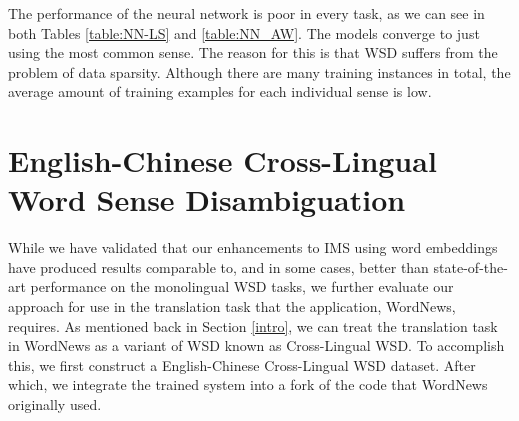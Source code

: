 \documentclass[11pt]{article}
\begin{document}
The performance of the neural network is poor in every task, as we can see in both Tables \ref{table:NN-LS} and \ref{table:NN_AW}. The models converge to just using the most common sense. The reason for this is that WSD suffers from the problem of data sparsity. Although there are many training instances in total, the average amount of training examples for each individual sense is low. 


\section{English-Chinese Cross-Lingual Word Sense Disambiguation}
\label{section:CLWSD}



While we have validated that our enhancements to IMS using word embeddings have produced results comparable to, and in some cases, better than state-of-the-art performance on the monolingual WSD tasks, we further evaluate our approach for use in the translation task that the application, WordNews, requires. As mentioned back in Section \ref{intro}, we can treat the translation task in WordNews as a variant of WSD known as Cross-Lingual WSD. To accomplish this, we first construct a English-Chinese Cross-Lingual WSD dataset. After which, we integrate the trained system into a fork of the code that WordNews originally used. 
\end{document}
